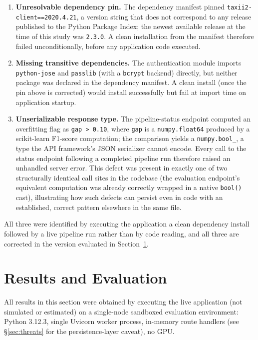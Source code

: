 \documentclass[conference]{IEEEtran}
\begin{document}
\begin{enumerate}
\item \textbf{Unresolvable dependency pin.} The dependency manifest pinned \texttt{taxii2-client==2020.4.21}, a version string that does not correspond to any release published to the Python Package Index; the newest available release at the time of this study was \texttt{2.3.0}. A clean installation from the manifest therefore failed unconditionally, before any application code executed.
\item \textbf{Missing transitive dependencies.} The authentication module imports \texttt{python-jose} and \texttt{passlib} (with a \texttt{bcrypt} backend) directly, but neither package was declared in the dependency manifest. A clean install (once the pin above is corrected) would install successfully but fail at import time on application startup.
\item \textbf{Unserializable response type.} The pipeline-status endpoint computed an overfitting flag as \texttt{gap > 0.10}, where \texttt{gap} is a \texttt{numpy.float64} produced by a scikit-learn F1-score computation; the comparison yields a \texttt{numpy.bool\_}, a type the API framework's JSON serializer cannot encode. Every call to the status endpoint following a completed pipeline run therefore raised an unhandled server error. This defect was present in exactly one of two structurally identical call sites in the codebase (the evaluation endpoint's equivalent computation was already correctly wrapped in a native \texttt{bool()} cast), illustrating how such defects can persist even in code with an established, correct pattern elsewhere in the same file.
\end{enumerate}

All three were identified by executing the application \textemdash{} a clean dependency install followed by a live pipeline run \textemdash{} rather than by code reading, and all three are corrected in the version evaluated in Section~\ref{sec:evaluation}.

\section{Results and Evaluation}
\label{sec:evaluation}

All results in this section were obtained by executing the live application (not simulated or estimated) on a single-node sandboxed evaluation environment: Python 3.12.3, single Uvicorn worker process, in-memory route handlers (see \S\ref{sec:threats} for the persistence-layer caveat), no GPU.
\end{document}
